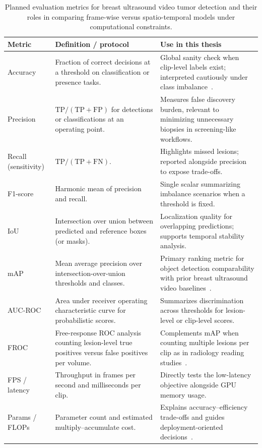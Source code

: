 \documentclass[
english,                 %
bibtex,                  %
]{kththesis}
\numberwithin{listing}{chapter}
\begin{document}
\begin{table}[!ht]
  \centering
  \small
  \caption{Planned evaluation metrics for breast ultrasound video tumor detection and their roles in comparing frame-wise versus spatio-temporal models under computational constraints.}
  \label{tab:eval_metrics_methods}
  \begin{tabular}{@{}p{}p{}p{}@{}}
    \toprule
    \textbf{Metric} & \textbf{Definition / protocol} & \textbf{Use in this thesis} \\
    \midrule
    Accuracy & Fraction of correct decisions at a threshold on classification or presence tasks. & Global sanity check when clip-level labels exist; interpreted cautiously under class imbalance~\cite{dan2024_breast_us_dl_review}. \\
    Precision & $\mathrm{TP}/(\mathrm{TP}+\mathrm{FP})$ for detections or classifications at an operating point. & Measures false discovery burden, relevant to minimizing unnecessary biopsies in screening-like workflows. \\
    Recall (sensitivity) & $\mathrm{TP}/(\mathrm{TP}+\mathrm{FN})$. & Highlights missed lesions; reported alongside precision to expose trade-offs. \\
    F1-score & Harmonic mean of precision and recall. & Single scalar summarizing imbalance scenarios when a threshold is fixed. \\
    IoU & Intersection over union between predicted and reference boxes (or masks). & Localization quality for overlapping predictions; supports temporal stability analysis. \\
    mAP & Mean average precision over intersection-over-union thresholds and classes. & Primary ranking metric for object detection comparability with prior breast ultrasound video baselines~\cite{lin2022_buv_miccai,lin2017_focal_loss_retinanet}. \\
    AUC-ROC & Area under receiver operating characteristic curve for probabilistic scores. & Summarizes discrimination across thresholds for lesion-level or clip-level scores. \\
    FROC & Free-response ROC analysis counting lesion-level true positives versus false positives per volume. & Complements mAP when counting multiple lesions per clip as in radiology reading studies~\cite{lin2022_buv_miccai}. \\
    FPS / latency & Throughput in frames per second and milliseconds per clip. & Directly tests the low-latency objective alongside GPU memory usage. \\
    Params / FLOPs & Parameter count and estimated multiply--accumulate cost. & Explains accuracy--efficiency trade-offs and guides deployment-oriented decisions~\cite{liu2023_edgemednet}. \\
    \bottomrule
  \end{tabular}
\end{table}
\end{document}
